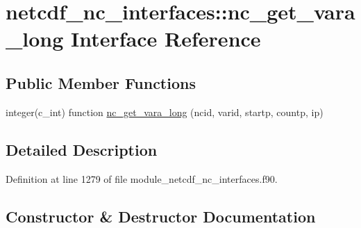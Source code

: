 \hypertarget{interfacenetcdf__nc__interfaces_1_1nc__get__vara__long}{}\section{netcdf\+\_\+nc\+\_\+interfaces\+:\+:nc\+\_\+get\+\_\+vara\+\_\+long Interface Reference}
\label{interfacenetcdf__nc__interfaces_1_1nc__get__vara__long}
\subsection*{Public Member Functions}
\begin{DoxyCompactItemize}
\item 
integer(c\+\_\+int) function \hyperlink{interfacenetcdf__nc__interfaces_1_1nc__get__vara__long_a6337e9d35ef03b5ffda523daa3ea699a}{nc\+\_\+get\+\_\+vara\+\_\+long} (ncid, varid, startp, countp, ip)
\end{DoxyCompactItemize}


\subsection{Detailed Description}


Definition at line 1279 of file module\+\_\+netcdf\+\_\+nc\+\_\+interfaces.\+f90.



\subsection{Constructor \& Destructor Documentation}
\mbox{\label{interfacenetcdf__nc__interfaces_1_1nc__get__vara__long_a6337e9d35ef03b5ffda523daa3ea699a}} 
